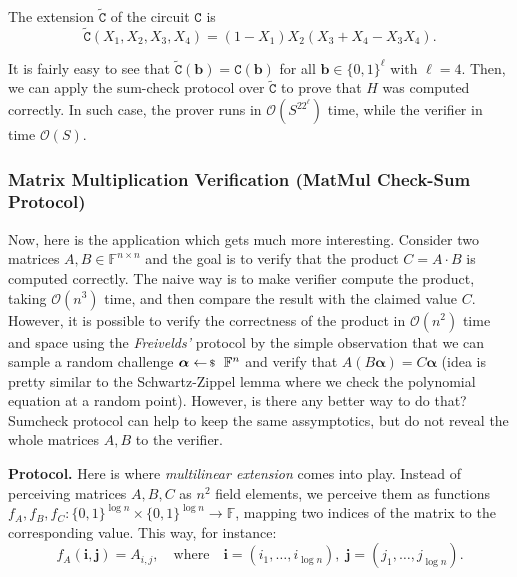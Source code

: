 The extension $\widetilde{\mathtt{C}}$ of the circuit $\mathtt{C}$ is
\begin{equation*}
    \widetilde{\mathtt{C}}(X_1,X_2,X_3,X_4) = (1 - X_1)X_2(X_3 + X_4 - X_3X_4).
\end{equation*}

It is fairly easy to see that $\widetilde{\mathtt{C}}(\boldsymbol{b}) =
\mathtt{C}(\boldsymbol{b})$ for all $\boldsymbol{b} \in \{0,1\}^{\ell}$ with
$\ell=4$. Then, we can apply the sum-check protocol over
$\widetilde{\mathtt{C}}$ to prove that $H$ was computed correctly. In such case,
the prover runs in $\mathcal{O}(S^22^{\ell})$ time, while the verifier in time
$\mathcal{O}(S)$. 

\subsubsection{Matrix Multiplication Verification (MatMul Check-Sum Protocol)}

Now, here is the application which gets much more interesting. Consider two
matrices $A, B \in \mathbb{F}^{n \times n}$ and the goal is to verify that the
product $C = A \cdot B$ is computed correctly. The naive way is to make verifier
compute the product, taking $\mathcal{O}(n^3)$ time, and then compare the result
with the claimed value $C$. However, it is possible to verify the correctness of
the product in $\mathcal{O}(n^2)$ time and space using the \textit{Freivelds'}
protocol by the simple observation that we can sample a random challenge
$\boldsymbol{\alpha} \leftarrowS \mathbb{F}^n$ and verify that
$A(B\boldsymbol{\alpha}) = C\boldsymbol{\alpha}$ (idea is pretty similar
to the Schwartz-Zippel lemma where we check the polynomial equation at a 
random point). However, is there any better way to do that? Sumcheck 
protocol can help to keep the same assymptotics, but do not reveal 
the whole matrices $A,B$ to the verifier.

\textbf{Protocol.} Here is where \textit{multilinear extension} comes into play.
Instead of perceiving matrices $A,B,C$ as $n^2$ field elements, we perceive 
them as functions $f_A, f_B, f_C: \{0,1\}^{\log n} \times \{0,1\}^{\log n} \to \mathbb{F}$,
mapping two indices of the matrix to the corresponding value. This way, for instance:
\begin{equation*}
    f_A(\boldsymbol{i}, \boldsymbol{j}) = A_{i,j}, \quad \text{where} \quad \boldsymbol{i}=(i_1,\dots,i_{\log n}), \; \boldsymbol{j}=(j_1,\dots,j_{\log n}).
\end{equation*}

